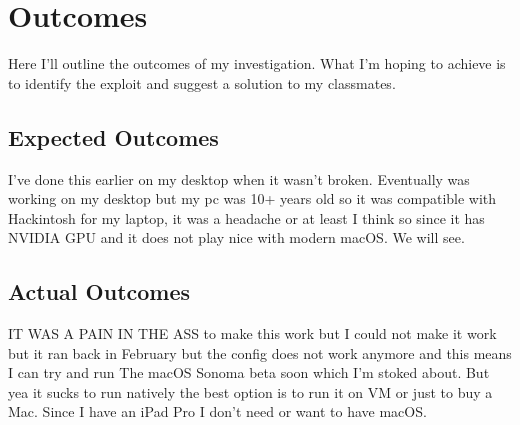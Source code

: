 \documentclass[12pt, letterpaper]{article}
\begin{document}
\section{Outcomes}
Here I'll outline the outcomes of my investigation. What I'm hoping to achieve is to identify the exploit and suggest a solution to my classmates.

\subsection{Expected Outcomes}
I've done this earlier on my desktop when it wasn't broken. Eventually was working on my desktop but my pc was 10+ years old so it was compatible with Hackintosh for my laptop, it was a headache or at least I think so since it has NVIDIA GPU and it does not play nice with modern macOS. We will see.

\subsection{Actual Outcomes}
IT WAS A PAIN IN THE ASS to make this work but I could not make it work but it ran back in February but the config does not work anymore and this means I can try and run The macOS Sonoma beta soon which I'm stoked about. But yea it sucks to run natively the best option is to run it on VM or just to buy a Mac. Since I have an iPad Pro I don't need or want to have macOS. 
\end{document}
